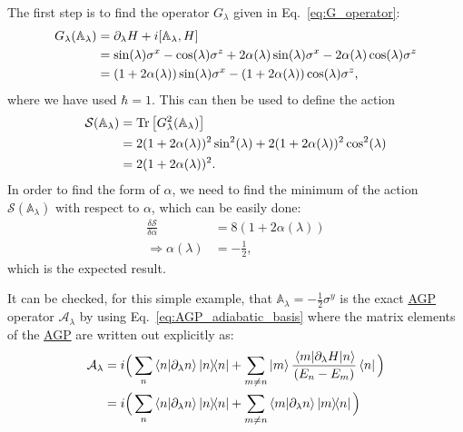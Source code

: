 \documentclass[a4paper,oneside,11pt]{book}
\newcommand{\sx}{\sigma^x}
\newcommand{\sy}{\sigma^y}
\newcommand{\sz}{\sigma^z}
\newcommand{\dlambda}{\partial_{\lambda}}
\newcommand{\AGP}[1]{\mathcal{A}_{#1}}
\newcommand{\approxAGP}{\mathbb{A}_{\lambda}}
\newcommand{\acrref}[1]{\hyperref[acr:#1]{#1}}
\begin{document}
The first step is to find the operator $G_{\lambda}$ given in Eq.~\eqref{eq:G_operator}:
\begin{equation}
    \begin{aligned}
        G_{\lambda}(\approxAGP) &= \dlambda H + i\comm{\approxAGP}{H} \\
        & = \sin(\lambda)\sx - \cos(\lambda)\sz + 2\alpha(\lambda)\sin(\lambda)\sx - 2\alpha(\lambda) \cos(\lambda)\sz \\
        & = (1 + 2\alpha(\lambda))\sin(\lambda) \sx - (1 + 2\alpha(\lambda))\cos(\lambda)\sz,
    \end{aligned}
\end{equation}
where we have used $\hbar = 1$. This can then be used to define the action
\begin{equation}
    \begin{aligned}
        \mathcal{S}(\approxAGP) &= \Tr\left[G^2_{\lambda}(\approxAGP) \right] \\
        & = 2 (1 + 2\alpha(\lambda))^2 \sin^2(\lambda) + 2 (1 + 2\alpha(\lambda))^2 \cos^2(\lambda) \\
        & = 2 (1 + 2\alpha(\lambda))^2.
    \end{aligned}
\end{equation}
In order to find the form of $\alpha$, we need to find the minimum of the action $\mathcal{S}(\approxAGP)$ with respect to $\alpha$, which can be easily done:
\begin{equation}
    \begin{aligned}
        \frac{\delta \mathcal{S}}{\delta \alpha} &= 8(1 + 2\alpha(\lambda)) \\
        \Rightarrow \alpha(\lambda) &= -\frac{1}{2},
    \end{aligned}
\end{equation}
which is the expected result. 

It can be checked, for this simple example, that $\approxAGP = -\frac{1}{2} \sy$ is the exact \acrref{AGP} operator $\AGP{\lambda}$ by using Eq.~\eqref{eq:AGP_adiabatic_basis} where the matrix elements of the \acrref{AGP} are written out explicitly as:
\begin{equation}
    \begin{aligned}
        \AGP{\lambda} &= i \Big(\sum_n \braket{n}{\dlambda n} \dyad{n} + \sum_{m \neq n} \ket{m} \frac{\mel{m}{\dlambda H}{n}}{(E_n - E_m)} \bra{n} \Big) \\
        & = i \Big(\sum_n \braket{n}{\dlambda n} \dyad{n} + \sum_{m \neq n} \braket{m}{\dlambda n} \dyad{m}{n}\Big)
    \end{aligned}
\end{equation}
\end{document}
